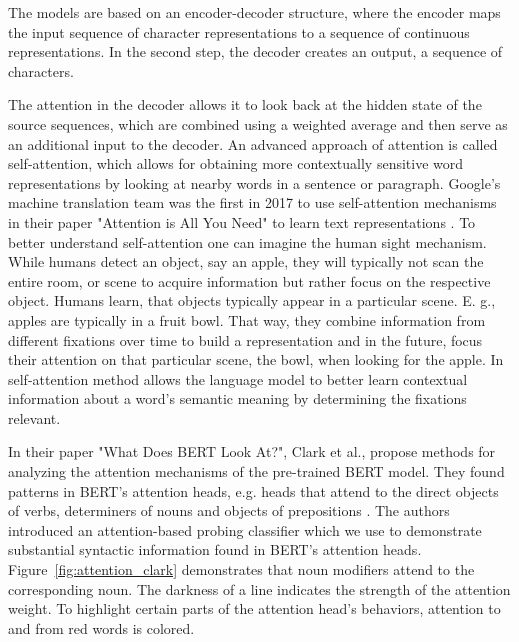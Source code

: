 The models are based on an encoder-decoder structure, where the encoder maps the input sequence of character representations to a sequence of continuous representations. In the second step, the decoder creates an output, a sequence of characters. 

The attention in the decoder allows it to look back at the hidden state of the source sequences, which are combined using a weighted average and then serve as an additional input to the decoder. 
An advanced approach of attention is called self-attention, which allows for obtaining more contextually sensitive word representations by looking at nearby words in a sentence or paragraph. Google's machine translation team was the first in 2017 to use self-attention mechanisms in their paper "Attention is All You Need" to learn text representations \cite{vaswani2017attention}. To better understand self-attention one can imagine the human sight mechanism. While humans detect an object, say an apple, they will typically not scan the entire room, or scene to acquire information but rather focus on the respective object. Humans learn, that objects typically appear in a particular scene. E. g., apples are typically in a fruit bowl. That way, they combine information from different fixations over time to build a representation and in the future, focus their attention on that particular scene, the bowl, when looking for the apple. In self-attention method allows the language model to better learn contextual information about a word's semantic meaning by determining the fixations relevant. 

In their paper "What Does BERT Look At?", Clark et al., propose methods for analyzing the attention mechanisms of the pre-trained BERT model. They found patterns in BERT's attention heads, e.g. heads that attend to the direct objects of verbs, determiners of nouns and objects of prepositions \cite{clark2019does}. The authors introduced an attention-based probing classifier which we use to demonstrate substantial syntactic information found in BERT's attention heads. Figure~\ref{fig:attention_clark} demonstrates that noun modifiers attend to the corresponding noun. The darkness of a line indicates the strength of the attention weight. To highlight certain parts of the attention head's behaviors, attention to and from red words is colored.

